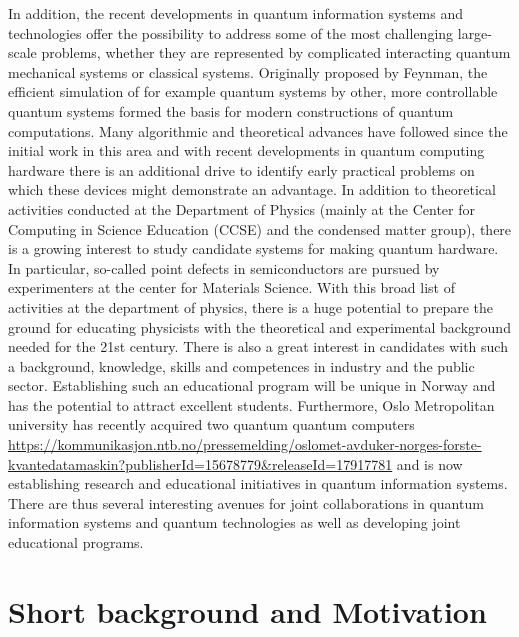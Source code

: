 \documentclass[aps,rmp,preprint,amsmath,amssymb,graphicx,longbibliography]{revtex4-1}
\begin{document}
In addition, the recent developments in quantum information systems
and technologies offer the possibility to address some of the most
challenging large-scale problems, whether they are represented by
complicated interacting quantum mechanical systems or classical
systems.  Originally proposed by Feynman, the efficient simulation of
for example quantum systems by other, more controllable quantum
systems formed the basis for modern constructions of quantum
computations.  Many algorithmic and theoretical advances have followed
since the initial work in this area and with recent developments in
quantum computing hardware there is an additional drive to identify
early practical problems on which these devices might demonstrate an
advantage. In addition to theoretical activities conducted at the
Department of Physics (mainly at the Center for Computing in Science
Education (CCSE) and the condensed matter group), there is a growing
interest to study candidate systems for making quantum hardware. In
particular, so-called point defects in semiconductors are pursued by
experimenters at the center for Materials Science.  With this broad
list of activities at the department of physics, there is a huge
potential to prepare the ground for educating physicists with the
theoretical and experimental background needed for the 21st
century. There is also a great interest in candidates with such a
background, knowledge, skills and competences in industry and the
public sector.  Establishing such an educational program will be
unique in Norway and has the potential to attract excellent students.
Furthermore, Oslo Metropolitan university  has recently acquired two quantum quantum computers \url{https://kommunikasjon.ntb.no/pressemelding/oslomet-avduker-norges-forste-kvantedatamaskin?publisherId=15678779&releaseId=17917781} and is now establishing research and educational initiatives in quantum information systems. There are thus several interesting avenues for joint collaborations in quantum information systems and quantum technologies as well as developing joint educational programs.


\section{Short background and Motivation}
\end{document}
